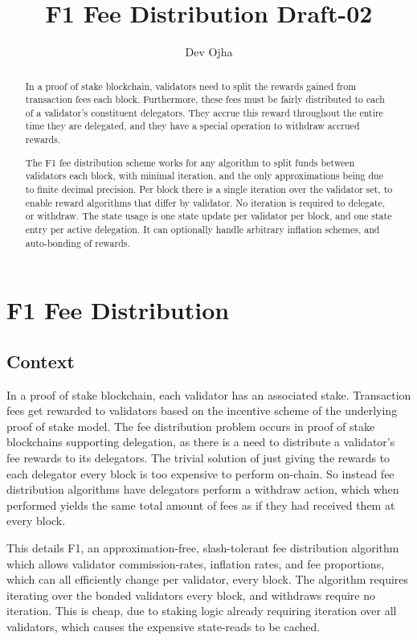 \documentclass[]{article}
\title{F1 Fee Distribution Draft-02}
\author{Dev Ojha}
\begin{document}
\maketitle

\begin{abstract}
	In a proof of stake blockchain, validators need to split the rewards gained from transaction fees each block. Furthermore, these fees must be fairly distributed to each of a validator's constituent delegators. They accrue this reward throughout the entire time they are delegated, and they have a special operation to withdraw accrued rewards.
	
	The F1 fee distribution scheme works for any algorithm to split funds between validators each block, with minimal iteration, and the only approximations being due to finite decimal precision. Per block there is a single iteration over the validator set, to enable reward algorithms that differ by validator. No iteration is required to delegate, or withdraw. The state usage is one state update per validator per block, and one state entry per active delegation. It can optionally handle arbitrary inflation schemes, and auto-bonding of rewards.
\end{abstract}

\section{F1 Fee Distribution}

\subsection{Context}
In a proof of stake blockchain, each validator has an associated stake.
Transaction fees get rewarded to validators based on the incentive scheme of the underlying proof of stake model.
The fee distribution problem occurs in proof of stake blockchains supporting delegation, as there is a need to distribute a validator's fee rewards to its delegators.
The trivial solution of just giving the rewards to each delegator every block is too expensive to perform on-chain.
So instead fee distribution algorithms have delegators perform a withdraw action, which when performed yields the same total amount of fees as if they had received them at every block. 

This details F1, an approximation-free, slash-tolerant fee distribution algorithm which allows validator commission-rates, inflation rates, and fee proportions, which can all efficiently change per validator, every block.
The algorithm requires iterating over the bonded validators every block, and withdraws require no iteration.
This is cheap, due to staking logic already requiring iteration over all validators, which causes the expensive state-reads to be cached.
\end{document}

